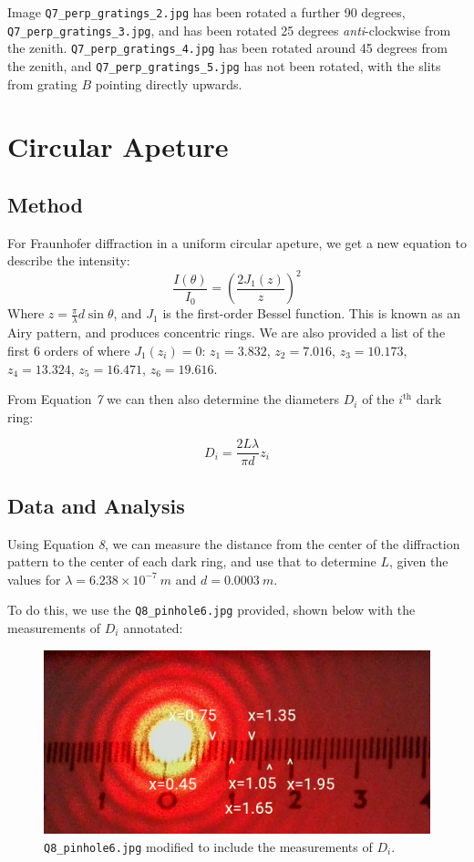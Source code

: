 \documentclass[a4paper]{article}
\begin{document}
Image {\lstinline$Q7_perp_gratings_2.jpg$} has been rotated a further 90 degrees, {\lstinline$Q7_perp_gratings_3.jpg$}, and has been rotated 25 degrees \emph{anti}-clockwise from the zenith. {\lstinline$Q7_perp_gratings_4.jpg$} has been rotated around 45 degrees from the zenith, and {\lstinline$Q7_perp_gratings_5.jpg$} has not been rotated, with the slits from grating $B$ pointing directly upwards.

\section{Circular Apeture}
\subsection{Method}
For Fraunhofer diffraction in a uniform circular apeture, we get a new equation to describe the intensity:
\begin{equation}
\frac{I(\theta)}{I_0}=\left(\frac{2J_1(z)}z\right)^2
\end{equation}
Where $z=\frac\pi\lambda d\sin\theta$, and $J_1$ is the first-order Bessel function. This is known as an Airy pattern, and produces concentric rings. We are also provided a list of the first 6 orders of where $J_1(z_i)=0$: $z_1 = 3.832$, $z_2 = 7.016$, $z_3 = 10.173$, $z_4 =
13.324$, $z_5 = 16.471$, $z_6 = 19.616$. 

From Equation \emph 7 we can then also determine the diameters $D_i$ of the $i^\text{th}$ dark ring:

\begin{equation}
D_i=\frac{2L\lambda}{\pi d}z_i
\end{equation}
\newpage
\subsection{Data and Analysis}

Using Equation \emph 8, we can measure the distance from the center of the diffraction pattern to the center of each dark ring, and use that to determine $L$, given the values for $\lambda=6.238\times10^{-7}\ m$ and $d=0.0003\ m$. 

To do this, we use the {\lstinline$Q8_pinhole6.jpg$} provided, shown below with the measurements of $D_i$ annotated:

\begin{figure}[h!]
\centering
\centerline{\includegraphics[scale=1.1]{pinhole.png}}
\caption{{\lstinline$Q8_pinhole6.jpg$} modified to include the measurements of $D_i$.} 
\label{fig:pinhole}
\end{figure}
\end{document}
